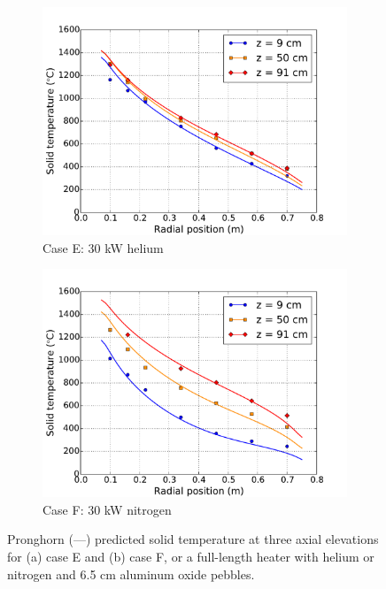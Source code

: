\begin{figure}[h!]
    \begin{subfigure}{0.5\linewidth}
        \centering
        \includegraphics[height=0.75\linewidth]{figs/exp_total_D2.pdf}
       \caption{Case E: 30 \si{\kilo\watt} helium}
    \end{subfigure}
    \begin{subfigure}{0.5\linewidth}
        \centering
        \includegraphics[height=0.75\linewidth]{figs/exp_total_J2.pdf}
        \caption{Case F: 30 \si{\kilo\watt} nitrogen}
    \end{subfigure}
    \caption{Pronghorn (---) predicted solid temperature at three axial elevations for (a) case E and (b) case F, or a full-length heater with helium or nitrogen and 6.5 \si{\centi\meter} aluminum oxide pebbles.}
    \label{fig:long65}
\end{figure}

